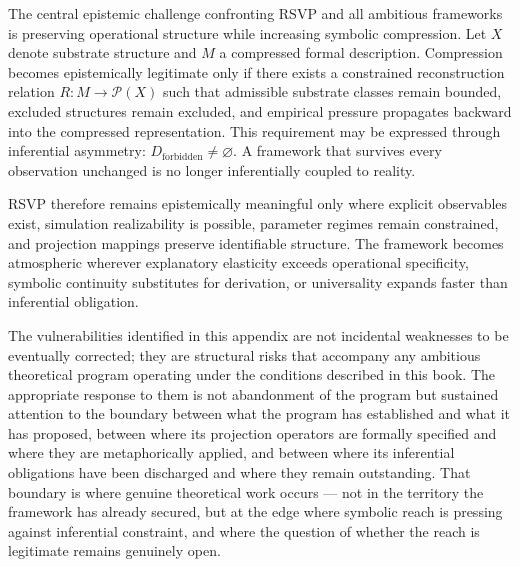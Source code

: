 \documentclass[12pt, openright, twoside]{book}
\begin{document}
The central epistemic challenge confronting RSVP and all ambitious
frameworks is preserving operational structure while increasing symbolic
compression. Let $X$ denote substrate structure and $M$ a compressed formal
description. Compression becomes epistemically legitimate only if there
exists a constrained reconstruction relation $R : M \to \mathcal{P}(X)$
such that admissible substrate classes remain bounded, excluded structures
remain excluded, and empirical pressure propagates backward into the
compressed representation. This requirement may be expressed through
inferential asymmetry: $D_{\mathrm{forbidden}} \neq \varnothing$. A
framework that survives every observation unchanged is no longer
inferentially coupled to reality.

RSVP therefore remains epistemically meaningful only where explicit
observables exist, simulation realizability is possible, parameter regimes
remain constrained, and projection mappings preserve identifiable structure.
The framework becomes atmospheric wherever explanatory elasticity exceeds
operational specificity, symbolic continuity substitutes for derivation,
or universality expands faster than inferential obligation.

The vulnerabilities identified in this appendix are not incidental
weaknesses to be eventually corrected; they are structural risks that
accompany any ambitious theoretical program operating under the conditions
described in this book. The appropriate response to them is not abandonment
of the program but sustained attention to the boundary between what the
program has established and what it has proposed, between where its
projection operators are formally specified and where they are metaphorically
applied, and between where its inferential obligations have been discharged
and where they remain outstanding. That boundary is where genuine
theoretical work occurs --- not in the territory the framework has already
secured, but at the edge where symbolic reach is pressing against
inferential constraint, and where the question of whether the reach is
legitimate remains genuinely open.

\clearpage



\backmatter
\end{document}
